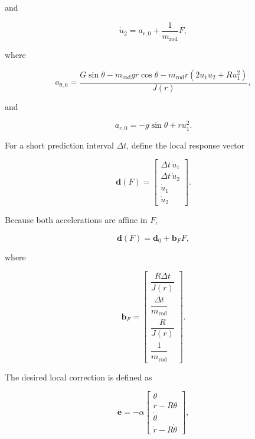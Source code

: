 and

\begin{equation}
\dot{u}_2
=
a_{r,0}
+
\frac{1}{m_{\mathrm{rod}}}F,
\label{eq:l2-rod-acceleration}
\end{equation}

where

\begin{equation}
a_{\theta,0}
=
\frac{
G\sin\theta
-m_{\mathrm{rod}}gr\cos\theta
-m_{\mathrm{rod}}r
\left(
2u_1u_2+Ru_1^2
\right)
}
{J(r)},
\end{equation}

and

\begin{equation}
a_{r,0}
=
-g\sin\theta+ru_1^2.
\end{equation}

For a short prediction interval $\Delta t$, define the local response vector

\begin{equation}
\mathbf{d}(F)
=
\begin{bmatrix}
\Delta t\,\dot{u}_1 \\
\Delta t\,\dot{u}_2 \\
\dot{u}_1 \\
\dot{u}_2
\end{bmatrix}.
\label{eq:l2-response-vector}
\end{equation}

Because both accelerations are affine in $F$,

\begin{equation}
\mathbf{d}(F)
=
\mathbf{d}_0+\mathbf{b}_F F,
\end{equation}

where

\begin{equation}
\mathbf{b}_F
=
\begin{bmatrix}
\dfrac{R\Delta t}{J(r)} \\[2mm]
\dfrac{\Delta t}{m_{\mathrm{rod}}} \\[2mm]
\dfrac{R}{J(r)} \\[2mm]
\dfrac{1}{m_{\mathrm{rod}}}
\end{bmatrix}.
\label{eq:l2-force-direction}
\end{equation}

The desired local correction is defined as

\begin{equation}
\mathbf{e}
=
-\alpha
\begin{bmatrix}
\theta \\
r-R\theta \\
\dot{\theta} \\
\dot{r}-R\dot{\theta}
\end{bmatrix},
\label{eq:l2-desired-correction}
\end{equation}

